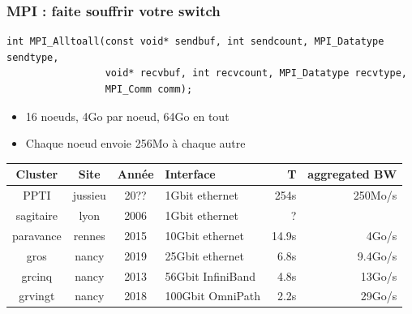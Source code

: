\documentclass[xcolor={x11names,svgnames}]{beamer}
\begin{document}

\begin{frame}[fragile]
\frametitle{MPI : faite souffrir votre switch}

\begin{verbatim}
int MPI_Alltoall(const void* sendbuf, int sendcount, MPI_Datatype sendtype,
                 void* recvbuf, int recvcount, MPI_Datatype recvtype,
                 MPI_Comm comm);
\end{verbatim}

\begin{itemize}  
\item 16 noeuds, 4Go par noeud, 64Go en tout
\item Chaque noeud envoie 256Mo à chaque autre
\end{itemize}

\bigskip

\footnotesize 
\begin{tabular}{|c|c|c|l|r|r|}
  \hline
  Cluster & Site & Année & Interface & T & aggregated BW \\
  \hline
  \hline
  PPTI      & jussieu & 20?? & \phantom{00}1Gbit ethernet & 254s & 250Mo/s \\
  \pause
  sagitaire & lyon  & 2006 & \phantom{00}1Gbit ethernet   & ? \\
  \pause
  paravance & rennes & 2015 & \phantom{0}10Gbit ethernet   & 14.9s & 4Go/s \\
  \pause
  gros      & nancy & 2019 & \phantom{0}25Gbit ethernet   & 6.8s & 9.4Go/s \\
  \pause
  grcinq    & nancy & 2013 & \phantom{0}56Gbit InfiniBand & 4.8s & 13Go/s\\
  \pause
  grvingt   & nancy & 2018 & 100Gbit OmniPath             & 2.2s & 29Go/s \\
  \hline
\end{tabular}
\end{frame}

\end{document}
